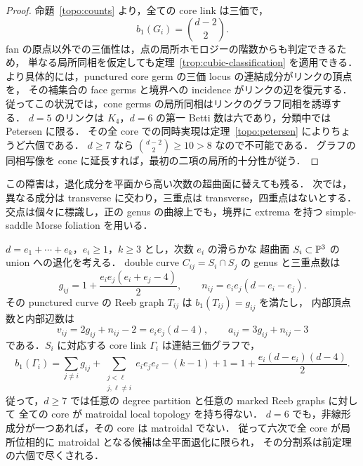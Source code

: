 \begin{proof}
命題~\ref{topo:counts} より，全ての core link は三価で，
\[
 b_1(G_i)=\binom{d-2}{2}.
\]
fan の原点以外での三価性は，点の局所ホモロジーの階数からも判定できるため，
単なる局所同相を仮定しても定理~\ref{trop:cubic-classification} を適用できる．
より具体的には，punctured core germ の三価 locus の連結成分がリンクの頂点を，
その補集合の face germs と境界への incidence がリンクの辺を復元する．
従ってこの状況では，cone germs の局所同相はリンクのグラフ同相を誘導する．
$d=5$ のリンクは $K_4$，$d=6$ の第一 Betti 数は六であり，分類中では Petersen に限る．
その全 core での同時実現は定理~\ref{topo:petersen} によりちょうど六個である．
$d\geq7$ なら $\binom{d-2}{2}\geq10>8$ なので不可能である．
グラフの同相写像を cone に延長すれば，最初の二項の局所的十分性が従う．
\end{proof}

この障害は，退化成分を平面から高い次数の超曲面に替えても残る．
次では，異なる成分は transverse に交わり，三重点は transverse，四重点はないとする．
交点は個々に標識し，正の genus の曲線上でも，境界に extrema を持つ
simple-saddle Morse foliation を用いる．

\begin{proposition}
\label{trop:partition-obstruction}
$d=e_1+\cdots+e_k$，$e_i\geq1$，$k\geq3$ とし，次数 $e_i$ の滑らかな
超曲面 $S_i\subset\mathbb P^3$ の union への退化を考える．
double curve $C_{ij}=S_i\cap S_j$ の genus と三重点数は
\begin{equation}\label{trop:double-curve-data}
 g_{ij}=1+\frac{e_i e_j(e_i+e_j-4)}2,
 \qquad n_{ij}=e_i e_j(d-e_i-e_j).
\end{equation}
その punctured curve の Reeb graph $T_{ij}$ は $b_1(T_{ij})=g_{ij}$ を満たし，
内部頂点数と内部辺数は
\[
 v_{ij}=2g_{ij}+n_{ij}-2=e_i e_j(d-4),\qquad
 a_{ij}=3g_{ij}+n_{ij}-3
\]
である．$S_i$ に対応する core link $\Gamma_i$ は連結三価グラフで，
\begin{equation}\label{trop:partition-core-genus}
 b_1(\Gamma_i)
 =\sum_{j\ne i}g_{ij}
  +\sum_{\substack{j<\ell\\j,\ell\ne i}}e_i e_j e_\ell-(k-1)+1
 =1+\frac{e_i(d-e_i)(d-4)}2.
\end{equation}
従って，$d\geq7$ では任意の degree partition と任意の marked Reeb graphs に対して
全ての core が matroidal local topology を持ち得ない．
$d=6$ でも，非線形成分が一つあれば，その core は matroidal でない．
従って六次で全 core が局所位相的に matroidal となる候補は全平面退化に限られ，
その分割系は前定理の六個で尽くされる．
\end{proposition}

